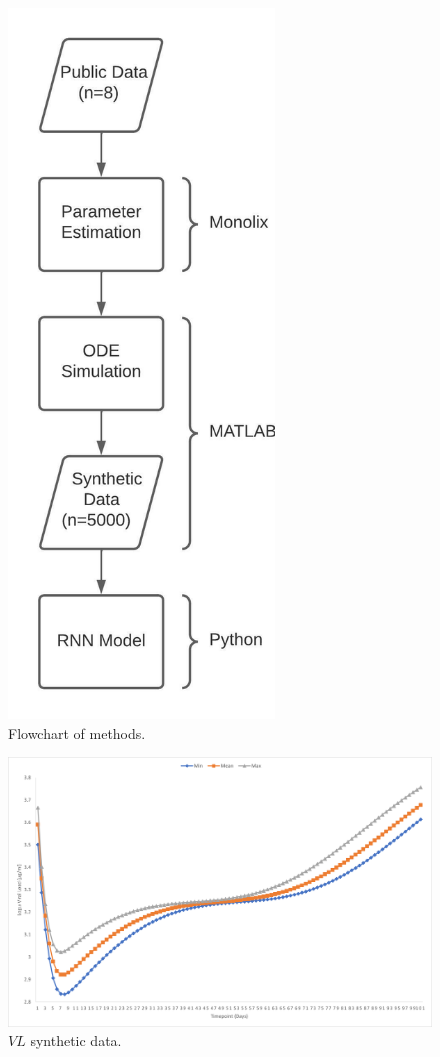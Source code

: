 \documentclass[fleqn,10pt]{wlscirep}
\begin{document}
\begin{figure}[ht]
\centering
\includegraphics[width=200pt]{Flowchart.jpeg}
\caption{Flowchart of methods.}
\label{fig:flowchart}
\end{figure}

\begin{figure}[ht]
\centering
\includegraphics[width= 500pt]{VL.png}
\caption{$VL$ synthetic data.}
\label{fig:VL}
\end{figure}
\end{document}
